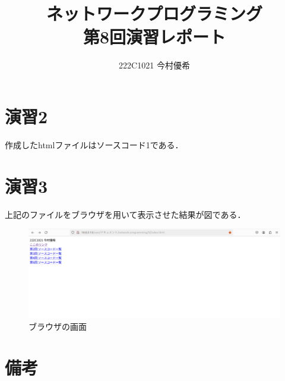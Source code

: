 \documentclass[documentclass]{jsarticle}
\begin{document}
\title{ネットワークプログラミング\\ 第8回演習レポート}
\author{222C1021 今村優希}
\maketitle

\newpage

\section*{演習2}
作成したhtmlファイルはソースコード1である．


\newpage

\section*{演習3}
上記のファイルをブラウザを用いて表示させた結果が図である．
\begin{figure}[H]
  \begin{center}
    \includegraphics*[scale=0.5]{figure/1-1.png}
  \end{center}
  \caption{ブラウザの画面}
  \label{fig:3-1}
\end{figure}

\section*{備考}
\end{document}
